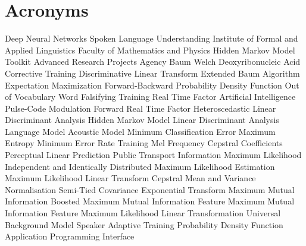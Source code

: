 \chapter{Acronyms}
\label{cha:acronyms}

\begin{acronym}[TDMA]
     {Deep Neural Networks}
     {Spoken Language Understanding}
     {Institute of Formal and Applied Linguistics}
     {Faculty of Mathematics and Physics}
     {Hidden Markov Model Toolkit}
     {Advanced Research Projects Agency}
     {Baum Welch}
     {Deoxyribonucleic Acid}
     {Corrective Training}
     {Discriminative Linear Transform}
     {Extended Baum Algorithm}
     {Expectation Maximization}
     {Forward-Backward}
     {Probability Density Function}
     {Out of Vocabulary Word}
     {Falsifying Training}
     {Real Time Factor}
     {Artificial Intelligence}
     {Pulse-Code Modulation}
     {Forward Real Time Factor}
     {Heteroscedastic Linear Discriminant Analysis}
     {Hidden Markov Model}
     {Linear Discriminant Analysis}
     {Language Model}
     {Acoustic Model}
     {Minimum Classification Error}
     {Maximum Entropy}
     {Minimum Error Rate Training}
     {Mel Frequency Cepstral Coefficients}
     {Perceptual Linear Prediction}
     {Public Transport Information}
     {Maximum Likelihood}
     {Independent and Identically Distributed}
     {Maximum Likelihood Estimation}
     {Maximum Likelihood Linear Transform}
     {Cepstral Mean and Variance Normalisation}
     {Semi-Tied Covariance}
     {Exponential Transform}
     {Maximum Mutual Information}
     {Boosted Maximum Mutual Information}
     {Feature Maximum Mutual Information}
     {Feature Maximum Likelihood Linear Transformation}
     {Universal Background Model}
     {Speaker Adaptive Training}
     {Probability Density Function}
     {Application Programming Interface}


\end{acronym}
